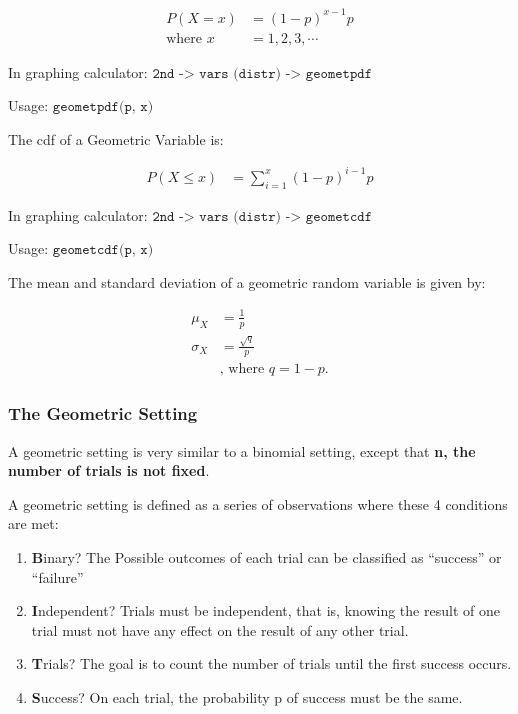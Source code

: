 \documentclass[
]{book}
\theoremstyle{definition}
\theoremstyle{definition}
\theoremstyle{definition}
\theoremstyle{definition}
\theoremstyle{remark}
\begin{document}
\[
\begin{aligned}
    P(X=x) &= (1-p)^{x-1}p\\
    \text{where } x &= 1, 2, 3, \cdots
\end{aligned}
\]

In graphing calculator: \(\texttt{2nd -> vars (distr) -> geometpdf}\)

Usage: \(\texttt{geometpdf(p, x)}\)

The cdf of a Geometric Variable is:

\[
\begin{aligned}
    P(X\leq x) &= \sum_{i=1}^x(1-p)^{i-1}p
\end{aligned}
\]

In graphing calculator: \(\texttt{2nd -> vars (distr) -> geometcdf}\)

Usage: \(\texttt{geometcdf(p, x)}\)

The mean and standard deviation of a geometric random variable is given
by:

\[
\begin{aligned}
    \mu_X &= \frac{1}{p} \\
    \sigma_X &= \frac{\sqrt{q}}{p} \\
    &\text{, where } q = 1-p.
\end{aligned}
\]

\hypertarget{the-geometric-setting}{%
\subsubsection{The Geometric Setting}\label{the-geometric-setting}}

A geometric setting is very similar to a binomial setting, except that
\textbf{n, the number of trials is not fixed}.

A geometric setting is defined as a series of observations where these 4
conditions are met:

\begin{enumerate}
\def\labelenumi{\arabic{enumi}.}
\item
  \textbf{B}inary? The Possible outcomes of each trial can be classified as
  ``success'' or ``failure''
\item
  \textbf{I}ndependent? Trials must be independent, that is, knowing the
  result of one trial must not have any effect on the result of any
  other trial.
\item
  \textbf{T}rials? The goal is to count the number of trials until the
  first success occurs.
\item
  \textbf{S}uccess? On each trial, the probability p of success must be the
  same.
\end{enumerate}
\end{document}
